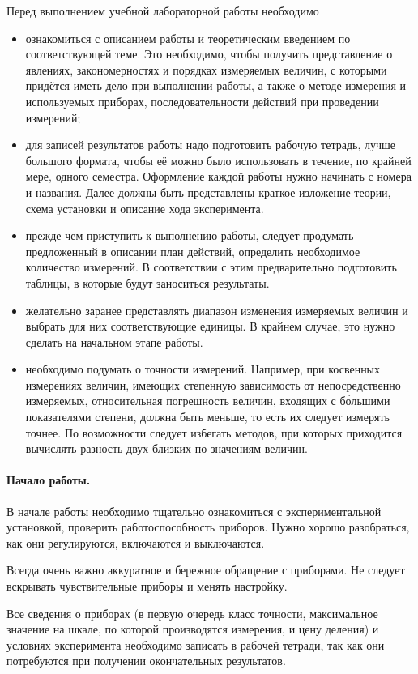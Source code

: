 \documentclass[10pt]{article}
\begin{document}
Перед выполнением учебной лабораторной работы необходимо
\begin{itemize}
\item ознакомиться с описанием работы и теоретическим введением по соответствующей
теме. Это необходимо, чтобы получить представление о явлениях, закономерностях
и порядках измеряемых величин, с которыми придётся иметь дело при
выполнении работы, а также о методе измерения и используемых приборах,
последовательности действий при проведении измерений;
\item для записей результатов работы надо подготовить рабочую тетрадь, лучше
большого формата, чтобы её можно было использовать в течение, по крайней
мере, одного семестра. Оформление каждой работы нужно начинать с номера
и названия. Далее должны быть представлены краткое изложение теории,
схема установки и описание хода эксперимента.
\item прежде чем приступить к выполнению работы, следует продумать предложенный
в описании план действий, определить необходимое количество измерений.
В соответствии с этим предварительно подготовить таблицы, в которые
будут заноситься результаты. 
\item желательно заранее представлять диапазон изменения измеряемых величин
и выбрать для них соответствующие единицы. В крайнем случае, это нужно
сделать на начальном этапе работы. 
\item необходимо подумать о точности измерений. Например, при косвенных
измерениях величин, имеющих степенную зависимость от непосредственно
измеряемых, относительная погрешность величин, входящих с б\'{о}льшими
показателями степени, должна быть меньше, то есть их следует измерять
точнее. По возможности следует избегать методов, при которых приходится
вычислять разность двух близких по значениям величин.
\end{itemize}


\paragraph{Начало работы.}

В начале работы необходимо тщательно ознакомиться с экспериментальной
установкой, проверить работоспособность приборов. Нужно хорошо разобраться,
как они регулируются, включаются и выключаются.

Всегда очень важно аккуратное и бережное обращение с приборами. Не
следует вскрывать чувствительные приборы и менять настройку.

Все сведения о приборах (в первую очередь класс точности, максимальное
значение на шкале, по которой производятся измерения, и цену деления)
и условиях эксперимента необходимо записать в рабочей тетради, так
как они потребуются при получении окончательных результатов.
\end{document}

